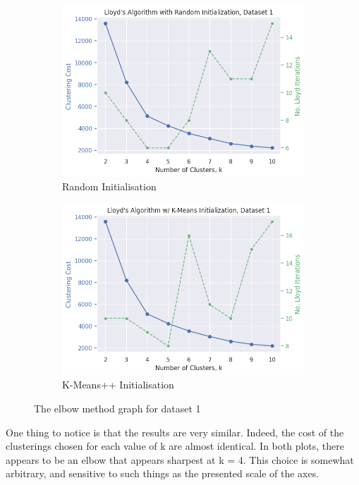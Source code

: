 \documentclass[12pt]{article}
\begin{document}
\begin{figure}[ht]
    \centering
    \begin{subfigure}{0.5\textwidth}
      \centering
      \includegraphics[width=\linewidth]{4.png}
      \caption{Random Initialisation}
      \label{fig:4}
    \end{subfigure}%
    \hfill
    \begin{subfigure}{0.5\textwidth}
      \centering
      \includegraphics[width=\linewidth]{6.png}
      \caption{K-Means++ Initialisation}
      \label{fig:6}
    \end{subfigure}%
    \caption{The elbow method graph for dataset 1}
    \label{fig:elbow_1}
\end{figure}

One thing to notice is that the results are very similar. Indeed, the cost of the
clusterings chosen for each value of k are almost identical. In both plots, there
appears to be an elbow that appears sharpest at k = 4. This choice is somewhat
arbitrary, and sensitive to such things as the presented scale of the axes.
\end{document}
